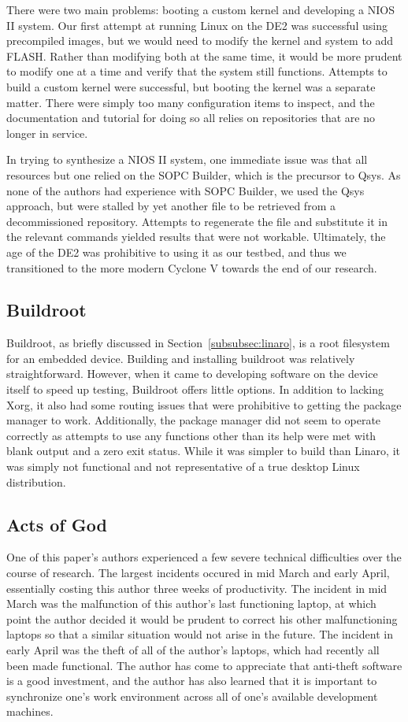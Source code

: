 \documentclass{sig-alternate-10pt}
\begin{document}
There were two main problems: booting a custom kernel and developing a NIOS
II system. Our first attempt at running Linux on the DE2 was successful
using precompiled images, but we would need to modify the kernel and system
to add FLASH. Rather than modifying both at the same time, it would be more
prudent to modify one at a time and verify that the system still functions.
Attempts to build a custom kernel were successful, but booting the kernel
was a separate matter. There were simply too many configuration items to
inspect, and the documentation and tutorial for doing so all relies on
repositories that are no longer in service.

In trying to synthesize a NIOS II system, one immediate issue was that all
resources but one relied on the SOPC Builder, which is the precursor to
Qsys. As none of the authors had experience with SOPC Builder, we used the
Qsys approach, but were stalled by yet another file to be retrieved from
a decommissioned repository. Attempts to regenerate the file and substitute
it in the relevant commands yielded results that were not workable.
Ultimately, the age of the DE2 was prohibitive to using it as our testbed,
and thus we transitioned to the more modern Cyclone V towards the end of our
research.

\subsection{Buildroot}
Buildroot, as briefly discussed in Section~\ref{subsubsec:linaro}, is a root
filesystem for an embedded device. Building and installing buildroot was
relatively straightforward. However, when it came to developing software on
the device itself to speed up testing, Buildroot offers little options. In
addition to lacking Xorg, it also had some routing issues that were
prohibitive to getting the package manager to work. Additionally, the
package manager did not seem to operate correctly as attempts to use any
functions other than its help were met with blank output and a zero exit
status. While it was simpler to build than Linaro, it was simply not
functional and not representative of a true desktop Linux distribution.

\subsection{Acts of God}
One of this paper's authors experienced a few severe technical difficulties
over the course of research. The largest incidents occured in mid March and
early April, essentially costing this author three weeks of productivity.
The incident in mid March was the malfunction of this author's last
functioning laptop, at which point the author decided it would be prudent to
correct his other malfunctioning laptops so that a similar situation would
not arise in the future. The incident in early April was the theft of all of
the author's laptops, which had recently all been made functional. The
author has come to appreciate that anti-theft software is a good investment,
and the author has also learned that it is important to synchronize one's
work environment across all of one's available development machines.
\end{document}
